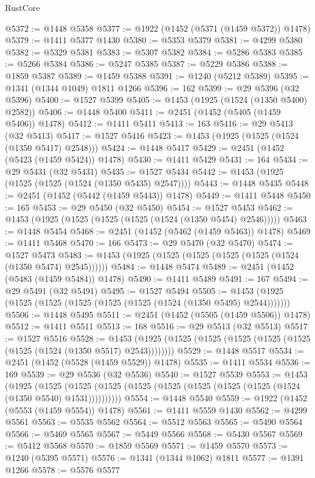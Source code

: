 \begin{lexlean}{RustCore}
\begin{coremodule}
@5372 := @1448 @5358
@5377 := @1922 (@1452 (@5371 (@1459 @5372)) @1478)
@5379 := @1411 @5377 @1430
@5380 := @5353 @5379
@5381 := @4299 @5380
@5382 := @5329 @5381
@5383 := @5307 @5382
@5384 := @5286 @5383
@5385 := @5266 @5384
@5386 := @5247 @5385
@5387 := @5229 @5386
@5388 := @1859 @5387
@5389 := @1459 @5388
@5391 := @1240 (@5212 @5389)
@5395 := @1341 (@1344 @1049) @1811 @1266
@5396 := 162
@5399 := @29 @5396 (@32 @5396)
@5400 := @1527 @5399
@5405 := @1453 (@1925 (@1524 (@1350 @5400) @2582))
@5406 := @1448 @5400
@5411 := @2451 (@1452 (@5405 (@1459 @5406)) @1478)
@5412 := @1411 @5411
@5413 := 163
@5416 := @29 @5413 (@32 @5413)
@5417 := @1527 @5416
@5423 := @1453 (@1925 (@1525 (@1524 (@1350 @5417) @2548)))
@5424 := @1448 @5417
@5429 := @2451 (@1452 (@5423 (@1459 @5424)) @1478)
@5430 := @1411 @5429
@5431 := 164
@5434 := @29 @5431 (@32 @5431)
@5435 := @1527 @5434
@5442 := @1453 (@1925 (@1525 (@1525 (@1524 (@1350 @5435) @2547))))
@5443 := @1448 @5435
@5448 := @2451 (@1452 (@5442 (@1459 @5443)) @1478)
@5449 := @1411 @5448
@5450 := 165
@5453 := @29 @5450 (@32 @5450)
@5454 := @1527 @5453
@5462 := @1453 (@1925 (@1525 (@1525 (@1525 (@1524 (@1350 @5454) @2546)))))
@5463 := @1448 @5454
@5468 := @2451 (@1452 (@5462 (@1459 @5463)) @1478)
@5469 := @1411 @5468
@5470 := 166
@5473 := @29 @5470 (@32 @5470)
@5474 := @1527 @5473
@5483 := @1453 (@1925 (@1525 (@1525 (@1525 (@1525 (@1524 (@1350 @5474) @2545))))))
@5484 := @1448 @5474
@5489 := @2451 (@1452 (@5483 (@1459 @5484)) @1478)
@5490 := @1411 @5489
@5491 := 167
@5494 := @29 @5491 (@32 @5491)
@5495 := @1527 @5494
@5505 := @1453 (@1925 (@1525 (@1525 (@1525 (@1525 (@1525 (@1524 (@1350 @5495) @2544)))))))
@5506 := @1448 @5495
@5511 := @2451 (@1452 (@5505 (@1459 @5506)) @1478)
@5512 := @1411 @5511
@5513 := 168
@5516 := @29 @5513 (@32 @5513)
@5517 := @1527 @5516
@5528 := @1453 (@1925 (@1525 (@1525 (@1525 (@1525 (@1525 (@1525 (@1524 (@1350 @5517) @2543))))))))
@5529 := @1448 @5517
@5534 := @2451 (@1452 (@5528 (@1459 @5529)) @1478)
@5535 := @1411 @5534
@5536 := 169
@5539 := @29 @5536 (@32 @5536)
@5540 := @1527 @5539
@5553 := @1453
    (@1925
      (@1525 (@1525 (@1525 (@1525 (@1525 (@1525 (@1525 (@1525 (@1524 (@1350 @5540) @1531))))))))))
@5554 := @1448 @5540
@5559 := @1922 (@1452 (@5553 (@1459 @5554)) @1478)
@5561 := @1411 @5559 @1430
@5562 := @4299 @5561
@5563 := @5535 @5562
@5564 := @5512 @5563
@5565 := @5490 @5564
@5566 := @5469 @5565
@5567 := @5449 @5566
@5568 := @5430 @5567
@5569 := @5412 @5568
@5570 := @1859 @5569
@5571 := @1459 @5570
@5573 := @1240 (@5395 @5571)
@5576 := @1341 (@1344 @1062) @1811
@5577 := @1391 @1266
@5578 := @5576 @5577

\end{coremodule}
\end{lexlean}
